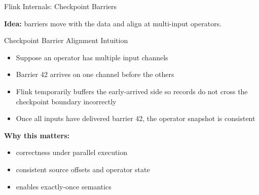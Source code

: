 \documentclass[aspectratio=169]{beamer}
\begin{document}
\begin{frame}{Flink Internals: Checkpoint Barriers}
\begin{center}
\end{center}

\vspace{0.15cm}
\textbf{Idea:} barriers move with the data and align at multi-input operators.
\end{frame}

\begin{frame}{Checkpoint Barrier Alignment Intuition}
\begin{itemize}
    \item Suppose an operator has multiple input channels
    \item Barrier 42 arrives on one channel before the others
    \item Flink temporarily buffers the early-arrived side so records do not cross the checkpoint boundary incorrectly
    \item Once all inputs have delivered barrier 42, the operator snapshot is consistent
\end{itemize}

\vspace{0.3cm}
\textbf{Why this matters:}
\begin{itemize}
    \item correctness under parallel execution
    \item consistent source offsets and operator state
    \item enables exactly-once semantics
\end{itemize}
\end{frame}
\end{document}
